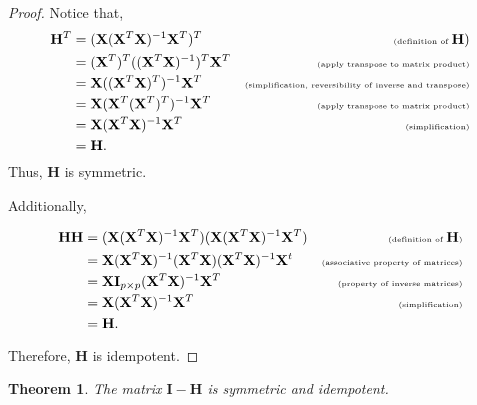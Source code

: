 \documentclass[
]{book}
\newtheorem{theorem}{Theorem}[chapter]
\theoremstyle{definition}
\theoremstyle{definition}
\theoremstyle{definition}
\theoremstyle{definition}
\theoremstyle{remark}
\begin{document}
\begin{proof}
Notice that,
\[
\begin{aligned}
\mathbf{H}^T&=(\mathbf{X}(\mathbf{X}^T\mathbf{X})^{-1}\mathbf{X}^T)^T&\tiny\text{(definition of }\mathbf{H})\\
&=(\mathbf{X}^T)^T((\mathbf{X}^T\mathbf{X})^{-1})^T\mathbf{X}^T&\tiny\text{(apply transpose to matrix product)}\\
&=\mathbf{X}((\mathbf{X}^T\mathbf{X})^T)^{-1}\mathbf{X}^T&\tiny\text{(simplification, reversibility of inverse and transpose)}\\
&=\mathbf{X}(\mathbf{X}^T(\mathbf{X}^T)^T)^{-1}\mathbf{X}^T&\tiny\text{(apply transpose to matrix product)}\\
&=\mathbf{X}(\mathbf{X}^T\mathbf{X})^{-1}\mathbf{X}^T&\tiny\text{(simplification)}\\
&=\mathbf{H}.
\end{aligned}
\]
Thus, \(\mathbf{H}\) is symmetric.

Additionally,

\[
\begin{aligned}
\mathbf{H}\mathbf{H}&=(\mathbf{X}(\mathbf{X}^T\mathbf{X})^{-1}\mathbf{X}^T)(\mathbf{X}(\mathbf{X}^T\mathbf{X})^{-1}\mathbf{X}^T)&\tiny\text{(definition of }\mathbf{H}\text{)}\\
&=\mathbf{X}(\mathbf{X}^T\mathbf{X})^{-1}(\mathbf{X}^T\mathbf{X})(\mathbf{X}^T\mathbf{X})^{-1}\mathbf{X}^t&\tiny\text{(associative property of matrices)}\\
&=\mathbf{X}\mathbf{I}_{p\times p}(\mathbf{X}^T\mathbf{X})^{-1}\mathbf{X}^T&\tiny\text{(property of inverse matrices)}\\
&=\mathbf{X}(\mathbf{X}^T\mathbf{X})^{-1}\mathbf{X}^T&\tiny\text{(simplification)}\\
&=\mathbf{H}.
\end{aligned}
\]

Therefore, \(\mathbf{H}\) is idempotent.
\end{proof}

\begin{theorem}
\protect\hypertarget{thm:i-h-properties}{}\label{thm:i-h-properties}The matrix \(\mathbf{I} - \mathbf{H}\) is symmetric and idempotent.
\end{theorem}
\end{document}
